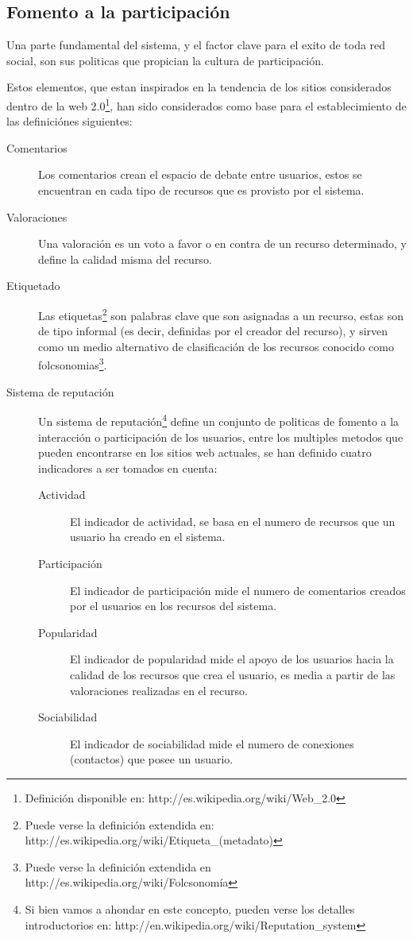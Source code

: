 \subsection{Fomento a la participación}

Una parte fundamental del sistema, y el factor clave para el exito de toda red
social, son sus politicas que propician la cultura de participación.

Estos elementos, que estan inspirados en la tendencia de los sitios considerados
dentro de la web 2.0\footnote{Definición disponible en:
http://es.wikipedia.org/wiki/Web\_2.0}, han sido considerados como base para el
establecimiento de las definiciónes siguientes:

\begin{description}
\item [Comentarios] Los comentarios crean el espacio de debate entre usuarios,
estos se encuentran en cada tipo de recursos que es provisto por el sistema.
\item [Valoraciones] Una valoración es un voto a favor o en contra de un recurso
determinado, y define la calidad misma del recurso.
\item [Etiquetado] Las etiquetas\footnote{Puede verse la definición extendida
en: http://es.wikipedia.org/wiki/Etiqueta\_(metadato)} son palabras clave que
son asignadas a un recurso, estas son de tipo informal (es decir, definidas por
el creador del recurso), y sirven como un medio alternativo de clasificación de
los recursos conocido como folcsonomias\footnote{Puede verse la definición
extendida en http://es.wikipedia.org/wiki/Folcsonomía}.
\item [Sistema de reputación] Un sistema de reputación\footnote{Si bien vamos a
ahondar en este concepto, pueden verse los detalles introductorios en:
http://en.wikipedia.org/wiki/Reputation\_system} define un conjunto de politicas
de fomento a la interacción o participación de los usuarios, entre los multiples
metodos que pueden encontrarse en los sitios web actuales, se han definido
cuatro indicadores a ser tomados en cuenta:
\begin{description}
    \item [Actividad] El indicador de actividad, se basa en el numero de
    recursos que un usuario ha creado en el sistema.
    \item [Participación] El indicador de participación mide el numero de
    comentarios creados por el usuarios en los recursos del sistema.
    \item [Popularidad] El indicador de popularidad mide el apoyo de los
    usuarios hacia la calidad de los recursos que crea el usuario, es media a
    partir de las valoraciones realizadas en el recurso.
    \item [Sociabilidad] El indicador de sociabilidad mide el numero de
    conexiones (contactos) que posee un usuario.
    \end{description}
\end{description}


